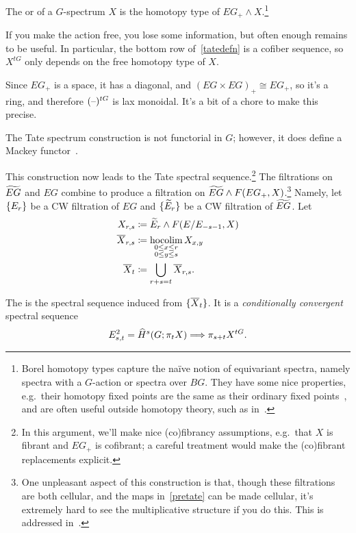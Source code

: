 \begin{defn}
The  or  of a $G$-spectrum $X$ is the homotopy type of
$EG_+\wedge X$.\footnote{Borel homotopy types capture the naïve notion of equivariant spectra, namely spectra with
a $G$-action or spectra over $BG$. They have some nice properties, e.g.\ their homotopy fixed points are the same
as their ordinary fixed points~\cite[Prop.~6.19]{MNN17}, and are often useful outside homotopy theory, such as
in~\cite{FreedHopkins}.}
\end{defn}
If you make the action free, you lose some information, but often enough remains to be useful. In particular, the
bottom row of~\eqref{tatedefn} is a cofiber sequence, so $X^{tG}$ only depends on the free homotopy type of $X$.
\begin{rem}
Since $EG_+$ is a space, it has a diagonal, and $(EG\times EG)_+\cong EG_+$, so it's a ring, and therefore
$(\text{--})^{tG}$ is lax monoidal. It's a bit of a chore to make this precise.

The Tate spectrum construction is not functorial in $G$; however, it does define a Mackey
functor~\cite{GeneralizedTate}.
\end{rem}
This construction now leads to the Tate spectral sequence.\footnote{In this argument, we'll make nice (co)fibrancy
assumptions, e.g.\ that $X$ is fibrant and $EG_+$ is cofibrant; a careful treatment would make the (co)fibrant
replacements explicit.} The filtrations on $\widetilde{EG}$ and $EG$ combine to produce a filtration on $\widetilde{EG}\wedge F(EG_+,
X)$.\footnote{One unpleasant aspect of this construction is that, though these filtrations are both cellular, and
the maps in~\eqref{pretate} can be made cellular, it's extremely hard to see the multiplicative structure if you do
this. This is addressed in~\cite{BMTate}.} Namely, let $\{E_r\}$ be a CW
filtration of $EG$ and $\{\widetilde E_r\}$ be a CW filtration of $\widetilde{EG}$. Let
\begin{align*}
	X_{r,s} &\coloneqq \widetilde E_r\wedge F(E/E_{-s-1}, X)\\
	\overline X_{r,s} &\coloneqq \operatorname*{hocolim}_{\substack{0\le x\le r\\0\le y\le s}} X_{x,y}\\
	\overline X_t &\coloneqq \bigcup_{r+s=t} \overline X_{r,s}.
\end{align*}
\begin{defn}
\label{tateSS}
The  is the spectral sequence induced from $\{\overline X_t\}$. It is a
\emph{conditionally convergent} spectral sequence
\[E_{s,t}^2 = \widehat H^s(G; \pi_tX)\Longrightarrow \pi_{s+t}X^{tG}.\]
\end{defn}
